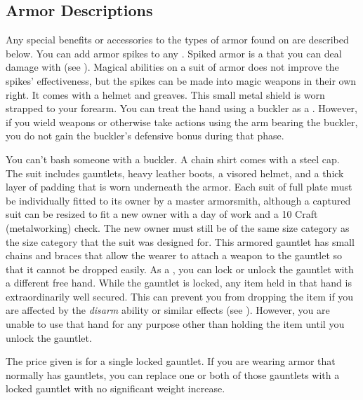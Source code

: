     \subsection{Armor Descriptions}
        Any special benefits or accessories to the types of armor found on  are described below.
         You can add armor spikes to any .
        Spiked armor is a  that you can deal damage with (see ).
        Magical abilities on a suit of armor does not improve the spikes' effectiveness, but the spikes can be made into magic weapons in their own right.
         It comes with a helmet and greaves.
         This small metal shield is worn strapped to your forearm.
        You can treat the hand using a buckler as a .
        However, if you wield weapons or otherwise take actions using the arm bearing the buckler, you do not gain the buckler's defensive bonus during that phase.
        \par You can't bash someone with a buckler.
         A chain shirt comes with a steel cap.
         The suit includes gauntlets, heavy leather boots, a visored helmet, and a thick layer of padding that is worn underneath the armor. Each suit of full plate must be individually fitted to its owner by a master armorsmith, although a captured suit can be resized to fit a new owner with a day of work and a  10 Craft (metalworking) check. The new owner must still be of the same size category as the size category that the suit was designed for.
         This armored gauntlet has small chains and braces that allow the wearer to attach a weapon to the gauntlet so that it cannot be dropped easily.
        As a , you can lock or unlock the gauntlet with a different free hand.
        While the gauntlet is locked, any item held in that hand is extraordinarily well secured.
        This can prevent you from dropping the item if you are affected by the \textit{disarm} ability or similar effects (see ).
        However, you are unable to use that hand for any purpose other than holding the item until you unlock the gauntlet.
        \par The price given is for a single locked gauntlet.
        If you are wearing armor that normally has gauntlets, you can replace one or both of those gauntlets with a locked gauntlet with no significant weight increase.
